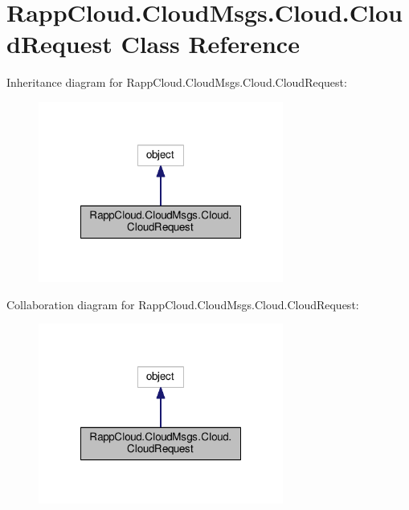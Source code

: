 \hypertarget{classRappCloud_1_1CloudMsgs_1_1Cloud_1_1CloudRequest}{\section{Rapp\-Cloud.\-Cloud\-Msgs.\-Cloud.\-Cloud\-Request Class Reference}
\label{classRappCloud_1_1CloudMsgs_1_1Cloud_1_1CloudRequest}
}


Inheritance diagram for Rapp\-Cloud.\-Cloud\-Msgs.\-Cloud.\-Cloud\-Request\-:
\nopagebreak
\begin{figure}[H]
\begin{center}
\leavevmode
\includegraphics[width=228pt]{classRappCloud_1_1CloudMsgs_1_1Cloud_1_1CloudRequest__inherit__graph}
\end{center}
\end{figure}


Collaboration diagram for Rapp\-Cloud.\-Cloud\-Msgs.\-Cloud.\-Cloud\-Request\-:
\nopagebreak
\begin{figure}[H]
\begin{center}
\leavevmode
\includegraphics[width=228pt]{classRappCloud_1_1CloudMsgs_1_1Cloud_1_1CloudRequest__coll__graph}
\end{center}
\end{figure}
